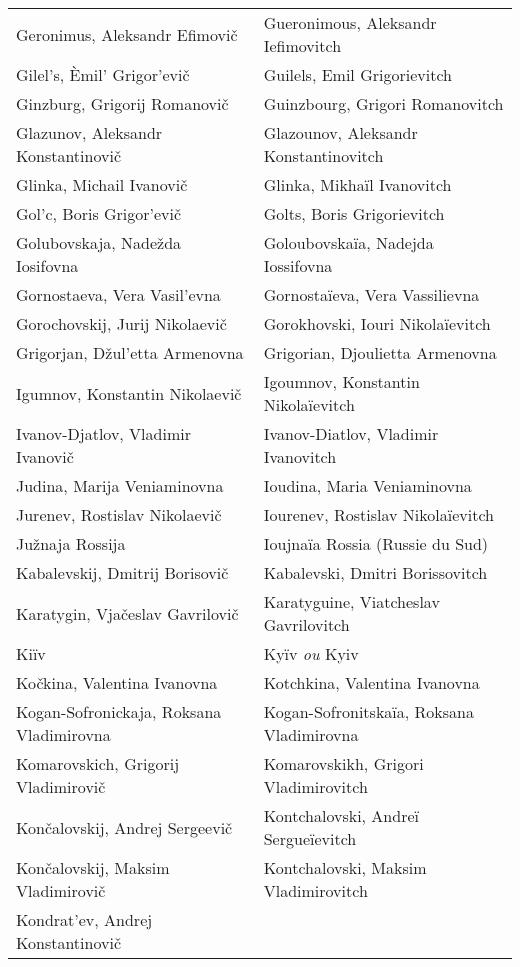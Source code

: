 {\begin{longtable}[c]{ll}
 \\
 Geronimus, Aleksandr Efimovič
 & Gueronimous, Aleksandr Iefimovitch
 \\
 Gilel's, Èmil' Grigor'evič
 & Guilels, Emil Grigorievitch
 \\
 Ginzburg, Grigorij Romanovič
 & Guinzbourg, Grigori Romanovitch
 \\
 Glazunov, Aleksandr Konstantinovič
 & Glazounov, Aleksandr Konstantinovitch
 \\
 Glinka, Michail Ivanovič
 & Glinka, Mikhaïl Ivanovitch
 \\
 Gol'c, Boris Grigor'evič
 & Golts, Boris Grigorievitch
 \\
 Golubovskaja, Nadežda Iosifovna
 & Goloubovskaïa, Nadejda Iossifovna
 \\
 Gornostaeva, Vera Vasil'evna
 & Gornostaïeva, Vera Vassilievna
 \\
 Gorochovskij, Jurij Nikolaevič
 & Gorokhovski, Iouri Nikolaïevitch
 \\
 Grigorjan, Džul'etta Armenovna
 & Grigorian, Djoulietta Armenovna
 \\
 Igumnov, Konstantin Nikolaevič
 & Igoumnov, Konstantin Nikolaïevitch
 \\
 Ivanov-Djatlov, Vladimir Ivanovič
 & Ivanov-Diatlov, Vladimir Ivanovitch
 \\
 Judina, Marija Veniaminovna
 & Ioudina, Maria Veniaminovna
 \\
 Jurenev, Rostislav Nikolaevič
 & Iourenev, Rostislav Nikolaïevitch
 \\
 Južnaja Rossija
 & Ioujnaïa Rossia (Russie du Sud)
 \\
 Kabalevskij, Dmitrij Borisovič
 & Kabalevski, Dmitri Borissovitch
 \\
 Karatygin, Vjačeslav Gavrilovič
 & Karatyguine, Viatcheslav Gavrilovitch
 \\
 Kiïv
 & Kyïv \emph{ou} Kyiv
 \\
 Kočkina, Valentina Ivanovna
 & Kotchkina, Valentina Ivanovna
 \\
 Kogan-Sofronickaja, Roksana Vladimirovna
 & Kogan-Sofronitskaïa, Roksana Vladimirovna
 \\
 Komarovskich, Grigorij Vladimirovič
 & Komarovskikh, Grigori Vladimirovitch
 \\
 Končalovskij, Andrej Sergeevič
 & Kontchalovski, Andreï Sergueïevitch
 \\
 Končalovskij, Maksim Vladimirovič
 & Kontchalovski, Maksim Vladimirovitch
 \\
 Kondrat'ev, Andrej Konstantinovič

\end{longtable}}
